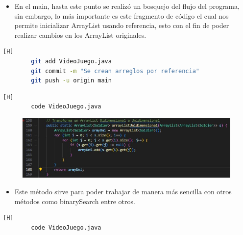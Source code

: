\documentclass{article}
\begin{document}
	
	\begin{itemize}	
		\item En el main, hasta este punto se realizó un bosquejo del flujo del programa, sin embargo, lo más importante es este fragmento de código el cual nos permite inicializar ArrayList usando referencia, esto con el fin de poder realizar cambios en los ArrayList originales.
	\end{itemize}
	
	\begin{lstlisting}[language=bash,caption={Commit: 5ae36c4b0202868075638aae95cc8a9a36f36118}][H]
		git add VideoJuego.java
		git commit -m "Se crean arreglos por referencia"			
		git push -u origin main
	\end{lstlisting}	
	
	
	
	\begin{lstlisting}[language=bash,caption={Metodo que trasnforma ArrayList Bidimensioanles a Unidimensionales}][H]
		code VideoJuego.java
	\end{lstlisting}
	
	\begin{figure}[H]
		\centering
		\includegraphics[width=1\textwidth,keepaspectratio]{img/arrayListU.jpg}
	\end{figure}
	
	
	\begin{itemize}	
		\item Este método sirve para poder trabajar de manera más sencilla con otros métodos como binarySearch entre otros.
	\end{itemize}
	
	
	
	
	
	
	
	
	
	
	
	\begin{lstlisting}[language=bash,caption={Se crea un método que iniciliza elementos de un ArrayList con nulls}][H]
		code VideoJuego.java
	\end{lstlisting}
	
\end{document}
